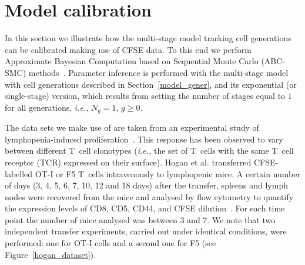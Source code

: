 \documentclass[10pt]{article}
\numberwithin{equation}{section}
\begin{document}
\section{Model calibration}
\label{results}

In this section we illustrate how the multi-stage model tracking cell generations can be calibrated making use of CFSE data. To this end 
we perform Approximate Bayesian Computation based on Sequential Monte Carlo (ABC-SMC) methods~\cite{toni}.
Parameter inference is performed with the multi-stage model with cell generations described in Section~\ref{model_gener}, and its exponential (or single-stage) version, which results from setting the number of stages equal to $1$
for all generations, {\em i.e.,} $N_g = 1$, $g\geq0$. 

The data sets we make use of are taken from an experimental study of lymphopenia-induced proliferation~\cite{hogan}. This response has been observed to vary between different T~cell clonotypes ({\em i.e.,} the set of T~cells with the same T~cell receptor (TCR) expressed on their surface). Hogan {\rm et al.} 
transferred CFSE-labelled OT-I or F5 T~cells
 intravenously to lymphopenic mice. A certain number of days (3, 4, 5, 6, 7, 10, 12 and 18 days) after the transfer, spleens and lymph nodes were recovered from the mice and analysed by flow cytometry to quantify the expression levels of CD8, CD5, CD44, and CFSE dilution~\cite{hogan}. 
 For each time point the number of mice analysed was 
between 3 and 7. We note that two independent transfer experiments,
carried out under identical conditions, 
were performed: one for OT-I cells and a second one for F5 (see 
 Figure~\ref{hogan_dataset}). 
 
\end{document}
